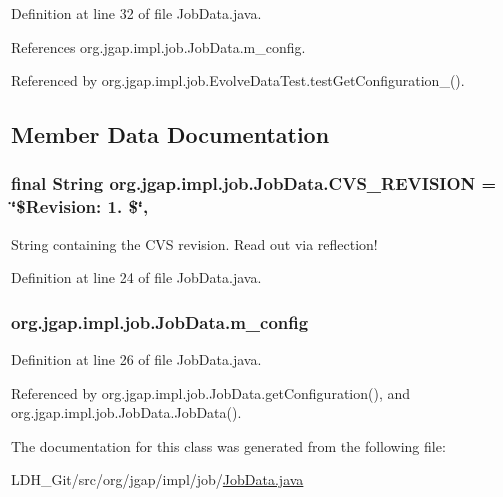 Definition at line 32 of file Job\-Data.\-java.



References org.\-jgap.\-impl.\-job.\-Job\-Data.\-m\-\_\-config.



Referenced by org.\-jgap.\-impl.\-job.\-Evolve\-Data\-Test.\-test\-Get\-Configuration\-\_().



\subsection{Member Data Documentation}
\hypertarget{classorg_1_1jgap_1_1impl_1_1job_1_1_job_data_af6508c806e077f3d00de46e728397dae}{
\subsubsection[{C\-V\-S\-\_\-\-R\-E\-V\-I\-S\-I\-O\-N}]{\setlength{\rightskip}{0pt plus 5cm}final String org.\-jgap.\-impl.\-job.\-Job\-Data.\-C\-V\-S\-\_\-\-R\-E\-V\-I\-S\-I\-O\-N = \char`\"{}\$Revision\-: 1. \$\char`\"{}\hspace{0.3cm}{\ttfamily [static]}, {\ttfamily [private]}}}\label{classorg_1_1jgap_1_1impl_1_1job_1_1_job_data_af6508c806e077f3d00de46e728397dae}
String containing the C\-V\-S revision. Read out via reflection! 

Definition at line 24 of file Job\-Data.\-java.

\hypertarget{classorg_1_1jgap_1_1impl_1_1job_1_1_job_data_a1e1a5782bf7834d1de16a5be230a38fb}{
\subsubsection[{m\-\_\-config}]{ org.\-jgap.\-impl.\-job.\-Job\-Data.\-m\-\_\-config\hspace{0.3cm}{\ttfamily [private]}}}\label{classorg_1_1jgap_1_1impl_1_1job_1_1_job_data_a1e1a5782bf7834d1de16a5be230a38fb}


Definition at line 26 of file Job\-Data.\-java.



Referenced by org.\-jgap.\-impl.\-job.\-Job\-Data.\-get\-Configuration(), and org.\-jgap.\-impl.\-job.\-Job\-Data.\-Job\-Data().



The documentation for this class was generated from the following file\-:\begin{DoxyCompactItemize}
\item 
L\-D\-H\-\_\-\-Git/src/org/jgap/impl/job/\hyperlink{_job_data_8java}{Job\-Data.\-java}\end{DoxyCompactItemize}
